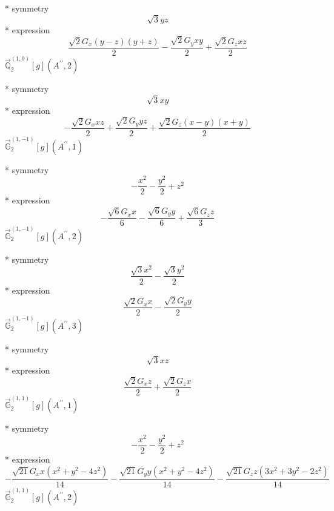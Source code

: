\documentclass[fleqn,8pt]{jsarticle}
\begin{document}
\noindent\quad ** symmetry
\begin{dmath*}
\sqrt{3} y z
\end{dmath*}
\noindent\quad ** expression
\begin{dmath*}
\frac{\sqrt{2} G_{x} \left(y - z\right) \left(y + z\right)}{2} - \frac{\sqrt{2} G_{y} x y}{2} + \frac{\sqrt{2} G_{z} x z}{2}
\end{dmath*}
\noindent\quad $\vec{\mathbb{Q}}_{2}^{(1,0)}[g](A^{\prime\prime},2)$

\noindent\quad ** symmetry
\begin{dmath*}
\sqrt{3} x y
\end{dmath*}
\noindent\quad ** expression
\begin{dmath*}
- \frac{\sqrt{2} G_{x} x z}{2} + \frac{\sqrt{2} G_{y} y z}{2} + \frac{\sqrt{2} G_{z} \left(x - y\right) \left(x + y\right)}{2}
\end{dmath*}
\noindent\quad $\vec{\mathbb{G}}_{2}^{(1,-1)}[g](A^{\prime\prime},1)$

\noindent\quad ** symmetry
\begin{dmath*}
- \frac{x^{2}}{2} - \frac{y^{2}}{2} + z^{2}
\end{dmath*}
\noindent\quad ** expression
\begin{dmath*}
- \frac{\sqrt{6} G_{x} x}{6} - \frac{\sqrt{6} G_{y} y}{6} + \frac{\sqrt{6} G_{z} z}{3}
\end{dmath*}
\noindent\quad $\vec{\mathbb{G}}_{2}^{(1,-1)}[g](A^{\prime\prime},2)$

\noindent\quad ** symmetry
\begin{dmath*}
\frac{\sqrt{3} x^{2}}{2} - \frac{\sqrt{3} y^{2}}{2}
\end{dmath*}
\noindent\quad ** expression
\begin{dmath*}
\frac{\sqrt{2} G_{x} x}{2} - \frac{\sqrt{2} G_{y} y}{2}
\end{dmath*}
\noindent\quad $\vec{\mathbb{G}}_{2}^{(1,-1)}[g](A^{\prime\prime},3)$

\noindent\quad ** symmetry
\begin{dmath*}
\sqrt{3} x z
\end{dmath*}
\noindent\quad ** expression
\begin{dmath*}
\frac{\sqrt{2} G_{x} z}{2} + \frac{\sqrt{2} G_{z} x}{2}
\end{dmath*}
\noindent\quad $\vec{\mathbb{G}}_{2}^{(1,1)}[g](A^{\prime\prime},1)$

\noindent\quad ** symmetry
\begin{dmath*}
- \frac{x^{2}}{2} - \frac{y^{2}}{2} + z^{2}
\end{dmath*}
\noindent\quad ** expression
\begin{dmath*}
- \frac{\sqrt{21} G_{x} x \left(x^{2} + y^{2} - 4 z^{2}\right)}{14} - \frac{\sqrt{21} G_{y} y \left(x^{2} + y^{2} - 4 z^{2}\right)}{14} - \frac{\sqrt{21} G_{z} z \left(3 x^{2} + 3 y^{2} - 2 z^{2}\right)}{14}
\end{dmath*}
\noindent\quad $\vec{\mathbb{G}}_{2}^{(1,1)}[g](A^{\prime\prime},2)$
\end{document}

